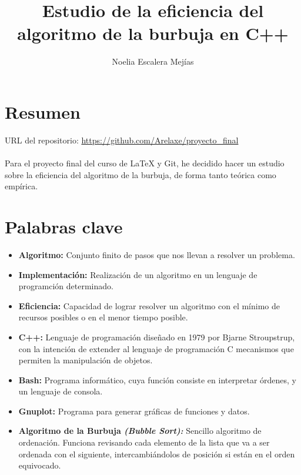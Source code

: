 \documentclass[a4paper,11pt]{article}
\begin{document}
\title{Estudio de la eficiencia del algoritmo de la burbuja en C++}
\author{Noelia Escalera Mejías}
\date{}
\maketitle
\section{Resumen}
URL del repositorio:
\url{https://github.com/Arelaxe/proyecto_final}
\\ \\
Para el proyecto final del curso de LaTeX y Git, he decidido hacer un estudio sobre la eficiencia del algoritmo de la burbuja, de forma tanto teórica como empírica.
\section{Palabras clave}
\begin{itemize}
\item {\bf Algoritmo:} Conjunto finito de pasos que nos llevan a resolver un problema.
\item {\bf Implementación:} Realización de un algoritmo en un lenguaje de programción determinado.
\item {\bf Eficiencia:} Capacidad de lograr resolver un algoritmo con el mínimo de recursos posibles o en el menor tiempo posible.
\item {\bf C++:} Lenguaje de programación diseñado en 1979 por Bjarne Stroupstrup, con la intención de extender al lenguaje de programación C mecanismos que permiten la manipulación de objetos.
\item {\bf Bash:} Programa informático, cuya función consiste en interpretar órdenes, y un lenguaje de consola.
\item {\bf Gnuplot:} Programa para generar gráficas de funciones y datos.
\item {\bf Algoritmo de la Burbuja \it (Bubble Sort):} Sencillo algoritmo de ordenación. Funciona revisando cada elemento de la lista que va a ser ordenada con el siguiente, intercambiándolos de posición si están en el orden equivocado.
\end{itemize}
\end{document}
